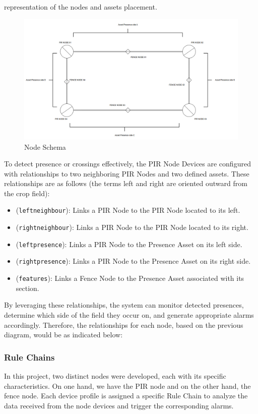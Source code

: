 representation of the nodes and assets placement.
\begin{figure}[H]
    \centering
    \includegraphics[width=1\textwidth]{./images/8/NodesSchematic.PNG}
    \caption{Node Schema}
    \label{fig:NodesSchematic}
\end{figure}

To detect presence or crossings effectively, the PIR Node Devices are configured with relationships to two neighboring PIR Nodes and two defined assets. These relationships 
are as follows (the terms left and right are oriented outward from the crop field):
\begin{itemize}
    \item (\texttt{leftneighbour}): Links a PIR Node to the PIR Node located to its left.
    \item (\texttt{rightneighbour}): Links a PIR Node to the PIR Node located to its right.
    \item (\texttt{leftpresence}): Links a PIR Node to the Presence Asset on its left side.
    \item (\texttt{rightpresence}): Links a PIR Node to the Presence Asset on its right side.
    \item (\texttt{features}): Links a Fence Node to the Presence Asset associated with its section.
\end{itemize}
By leveraging these relationships, the system can monitor detected presences, determine which side of the field they occur on, and generate appropriate alarms accordingly. 
Therefore, the relationships for each node, based on the previous diagram, would be as indicated below:



\subsubsection*{Rule Chains}
In this project, two distinct nodes were developed, each with its specific characteristics. On one hand, we have the PIR node and on the other hand, the fence node. 
Each device profile is assigned a specific Rule Chain to analyze the data received from the node devices and trigger the corresponding alarms.


